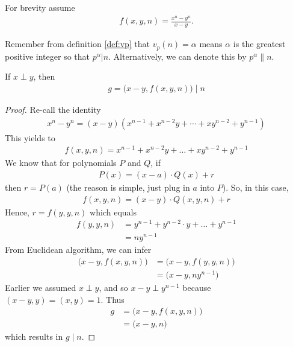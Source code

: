 \documentclass[main.tex]{subfile}
\begin{document}
	For brevity assume
	\begin{align*}
		f(x,y,n)=\frac{x^n-y^n}{x-y}.
	\end{align*}

	Remember from definition \eqref{def:vp} that $v_{p}(n)=\alpha$ means $\alpha$ is the greatest positive integer so that $p^\alpha|n$. Alternatively, we can denote this by $p^\alpha\|n$.

	\begin{theorem}\label{thm:egl}
		If $x\perp y$, then
			\begin{align*}
				g=\big(x-y,f(x,y,n)\big)\mid n
			\end{align*}
	\end{theorem}

	\begin{proof}
		Re-call the identity
			\begin{align*}
				x^n-y^n=(x-y)\left(x^{n-1}+x^{n-2}y+\cdots+xy^{n-2}+y^{n-1}\right)
			\end{align*}
		This yields to
			\begin{align*}
				f(x,y,n)=x^{n-1}+x^{n-2}y+\ldots+xy^{n-2}+y^{n-1}
			\end{align*}
		We know that for polynomials $P$ and $Q$, if
			\begin{align*}
				P(x)=(x-a)\cdot Q(x)+r
			\end{align*}
		then $r=P(a)$ (the reason is simple, just plug in $a$ into $P$). So, in this case,
			\begin{align*}
				f(x,y,n)=(x-y)\cdot Q(x,y,n)+r
			\end{align*}
		Hence, $r=f(y,y,n)$ which equals
		\begin{align*}
			f(y,y,n)
				& =y^{n-1}+y^{n-2}\cdot y+\ldots+y^{n-1}\\
				& =ny^{n-1}
		\end{align*}
		From Euclidean algorithm, we can infer
		\begin{align*}
			\big(x-y,f(x,y,n)\big)
				& =\big(x-y,f(y,y,n)\big)\\
				& =\big(x-y,ny^{n-1}\big)
		\end{align*}
		Earlier we assumed $x\perp y$, and so $x-y\perp y^{n-1}$ because $(x-y,y)=(x,y)=1$. Thus
		\begin{align*}
			g
				& =\big(x-y,f(x,y,n)\big)\\
				& =\big(x-y,n\big)
		\end{align*}
		which results in $g\mid n$.
	\end{proof}
\end{document}
